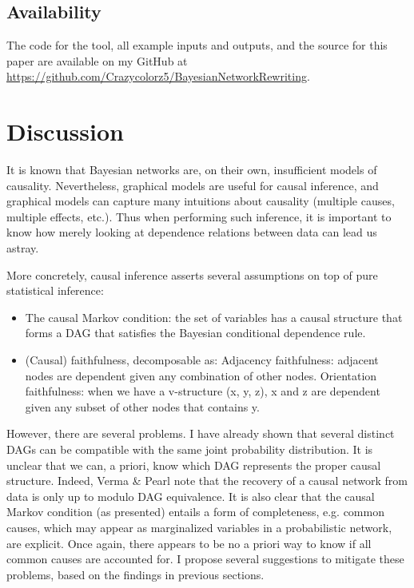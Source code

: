 \documentclass{article}
\begin{document}
	\subsection{Availability}
	The code for the tool, all example inputs and outputs, and the source for this paper are available on my GitHub at \url{https://github.com/Crazycolorz5/BayesianNetworkRewriting}.
	
	\section{Discussion}
	\label{discussion}
	
	It is known that Bayesian networks are, on their own, insufficient models of causality.
	Nevertheless, graphical models are useful for causal inference, and graphical models can capture many intuitions about causality (multiple causes, multiple effects, etc.).
	Thus when performing such inference, it is important to know how merely looking at dependence relations between data can lead us astray.
	
	More concretely, causal inference asserts several assumptions on top of pure statistical inference\cite{ramsey2012adjacencyfaithfulness}:
	\begin{itemize}
		\item The causal Markov condition: the set of variables has a causal structure that forms a DAG that satisfies the Bayesian conditional dependence rule.
		\item (Causal) faithfulness, decomposable as:
			\subitem Adjacency faithfulness: adjacent nodes are dependent given any combination of other nodes.
			\subitem Orientation faithfulness: when we have a v-structure (x, y, z), x and z are dependent given any subset of other nodes that contains y.
	\end{itemize}
	However, there are several problems.
	I have already shown that several distinct DAGs can be compatible with the same joint probability distribution.
	It is unclear that we can, a priori, know which DAG represents the proper causal structure.
	Indeed, Verma \& Pearl note that the recovery of a causal network from data is only up to modulo DAG equivalence\cite{verma2013equivalence}.
	It is also clear that the causal Markov condition (as presented) entails a form of completeness, e.g. common causes, which may appear as marginalized variables in a probabilistic network, are explicit.
	Once again, there appears to be no a priori way to know if all common causes are accounted for. I propose several suggestions to mitigate these problems, based on the findings in previous sections.
	
\end{document}
